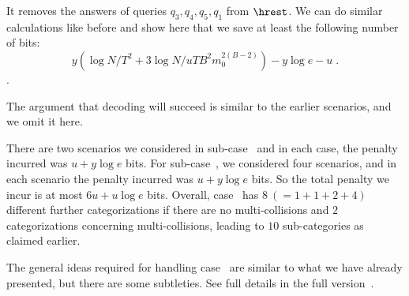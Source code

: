 {\begin{itemize}
\end{itemize}
It removes the answers of queries $q_3,q_4,q_5,q_1$ from $\hrest$.
We can do similar calculations like before and show here that we save at least the following number of bits: $$y(\log N/T^2 +3\log N/uTB^2m_0^{2(B-2)})- y\log e -u\;.$$.

The argument that decoding will succeed is similar to the earlier scenarios, and we omit it here.

\begin{remark}
There are two scenarios we considered in sub-case~ and in each case, the penalty incurred was $u+y\log e$ bits. For sub-case~, we considered four scenarios, and in each scenario the penalty incurred was $u+y\log e$ bits. So the total penalty we incur is at most $6u+u\log e$ bits. 
Overall, case~ has $8~(=1+1+2+4)$ different further categorizations if there are no multi-collisions and $2$ categorizations concerning multi-collisions, leading to $10$ sub-categories as claimed earlier.
\end{remark}
}
\ifnum{}
\compcasesix
\else
The general ideas required for handling case~ are similar to what we have already presented, but there are some subtleties. See full details in the full version~\cite{full}.
\fi